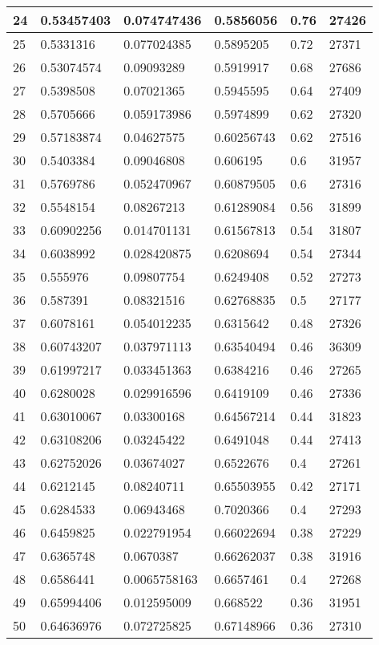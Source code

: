 \begin{longtable}{|l|l|l|l|l|l|}
24 & 0.53457403 & 0.074747436 & 0.5856056 & 0.76 & 27426 \\ \hline 
25 & 0.5331316 & 0.077024385 & 0.5895205 & 0.72 & 27371 \\ \hline 
26 & 0.53074574 & 0.09093289 & 0.5919917 & 0.68 & 27686 \\ \hline 
27 & 0.5398508 & 0.07021365 & 0.5945595 & 0.64 & 27409 \\ \hline 
28 & 0.5705666 & 0.059173986 & 0.5974899 & 0.62 & 27320 \\ \hline 
29 & 0.57183874 & 0.04627575 & 0.60256743 & 0.62 & 27516 \\ \hline 
30 & 0.5403384 & 0.09046808 & 0.606195 & 0.6 & 31957 \\ \hline 
31 & 0.5769786 & 0.052470967 & 0.60879505 & 0.6 & 27316 \\ \hline 
32 & 0.5548154 & 0.08267213 & 0.61289084 & 0.56 & 31899 \\ \hline 
33 & 0.60902256 & 0.014701131 & 0.61567813 & 0.54 & 31807 \\ \hline 
34 & 0.6038992 & 0.028420875 & 0.6208694 & 0.54 & 27344 \\ \hline 
35 & 0.555976 & 0.09807754 & 0.6249408 & 0.52 & 27273 \\ \hline 
36 & 0.587391 & 0.08321516 & 0.62768835 & 0.5 & 27177 \\ \hline 
37 & 0.6078161 & 0.054012235 & 0.6315642 & 0.48 & 27326 \\ \hline 
38 & 0.60743207 & 0.037971113 & 0.63540494 & 0.46 & 36309 \\ \hline 
39 & 0.61997217 & 0.033451363 & 0.6384216 & 0.46 & 27265 \\ \hline 
40 & 0.6280028 & 0.029916596 & 0.6419109 & 0.46 & 27336 \\ \hline 
41 & 0.63010067 & 0.03300168 & 0.64567214 & 0.44 & 31823 \\ \hline 
42 & 0.63108206 & 0.03245422 & 0.6491048 & 0.44 & 27413 \\ \hline 
43 & 0.62752026 & 0.03674027 & 0.6522676 & 0.4 & 27261 \\ \hline 
44 & 0.6212145 & 0.08240711 & 0.65503955 & 0.42 & 27171 \\ \hline 
45 & 0.6284533 & 0.06943468 & 0.7020366 & 0.4 & 27293 \\ \hline 
46 & 0.6459825 & 0.022791954 & 0.66022694 & 0.38 & 27229 \\ \hline 
47 & 0.6365748 & 0.0670387 & 0.66262037 & 0.38 & 31916 \\ \hline 
48 & 0.6586441 & 0.0065758163 & 0.6657461 & 0.4 & 27268 \\ \hline 
49 & 0.65994406 & 0.012595009 & 0.668522 & 0.36 & 31951 \\ \hline 
50 & 0.64636976 & 0.072725825 & 0.67148966 & 0.36 & 27310 \\ \hline 
\end{longtable}